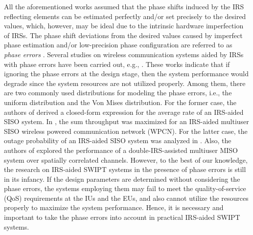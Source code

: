 \documentclass[12pt,draftclsnofoot, onecolumn]{IEEEtran}
\theoremstyle{plain}
\begin{document}
\begin{sloppypar}
All the aforementioned works assumed that the phase shifts induced by the IRS reflecting elements can be estimated perfectly and/or set precisely to the desired values, which, however, may be ideal due to the intrinsic hardware imperfection of IRSs. The phase shift deviations from the desired values caused by imperfect phase estimation and/or low-precision phase configuration are referred to as \emph{phase errors} \cite{2019_Badiu_PSE}. Several studies on wireless communication systems aided by IRSs with phase errors have been carried out, e.g., \cite{2021_Xing_error,2022_Zheng_PSE_WPCN,2022_Anastasios_PSE,2021_Tianxiong_PSE,2022_Zaid_PSE}. These works indicate that if ignoring the phase errors at the design stage, then the system performance would degrade since the system resources are not utilized properly. Among them, there are two commonly used distributions for modeling the phase errors, i.e., the uniform distribution and the Von Mises distribution. For the former case, the authors of \cite{2021_Xing_error} derived a closed-form expression for the average rate of an IRS-aided SISO system. In \cite{2022_Zheng_PSE_WPCN}, the sum throughput was maximized for an IRS-aided multiuser SISO wireless powered communication network (WPCN). %
For the latter case, the outage probability of an IRS-aided SISO system was analyzed in \cite{2021_Tianxiong_PSE}. Also, the authors of \cite{2022_Zaid_PSE} explored the performance of a double-IRS-assisted multiuser MISO system over spatially correlated channels. However, to the best of our knowledge, the research on IRS-aided SWIPT systems in the presence of phase errors is still in its infancy. If the design parameters are determined without considering the phase errors, the systems employing them may fail to meet the quality-of-service (QoS) requirements at the IUs and the EUs, and also cannot utilize the resources properly to maximize the system performance. Hence, it is necessary and important to take the phase errors into account in practical IRS-aided SWIPT systems. 


\end{sloppypar}
\end{document}
